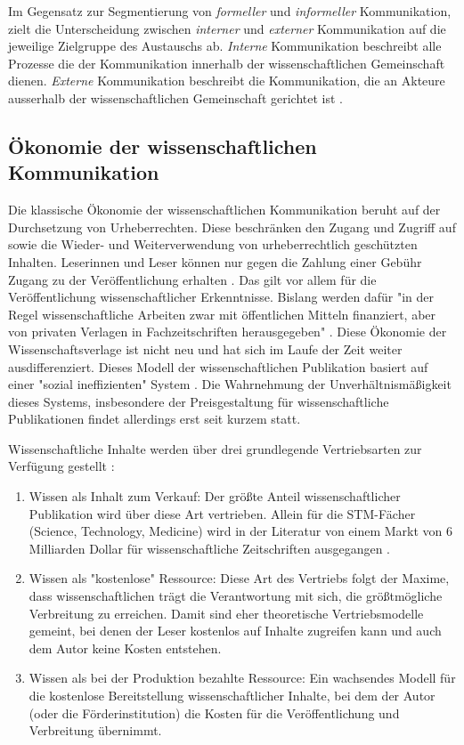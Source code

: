 Im Gegensatz zur Segmentierung von \textit{formeller} und \textit{informeller} Kommunikation, zielt die Unterscheidung zwischen \textit{interner} und \textit{externer} Kommunikation auf die jeweilige Zielgruppe des Austauschs ab. \textit{Interne} Kommunikation beschreibt alle Prozesse die der Kommunikation innerhalb der wissenschaftlichen Gemeinschaft dienen. \textit{Externe} Kommunikation beschreibt die Kommunikation, die an Akteure ausserhalb der wissenschaftlichen Gemeinschaft gerichtet ist \cite{Konneker_2013}.

\subsection{Ökonomie der wissenschaftlichen Kommunikation}

Die klassische Ökonomie der wissenschaftlichen Kommunikation beruht auf der Durchsetzung von Urheberrechten. Diese beschränken den Zugang und Zugriff auf sowie die Wieder- und Weiterverwendung von urheberrechtlich geschützten Inhalten. Leserinnen und Leser können nur gegen die Zahlung einer Gebühr Zugang zu der Veröffentlichung erhalten \cite{CREATe_2014}. Das gilt vor allem für die Veröffentlichung wissenschaftlicher Erkenntnisse. Bislang werden dafür "in der Regel wissenschaftliche Arbeiten zwar mit öffentlichen Mitteln finanziert, aber von privaten Verlagen in Fachzeitschriften herausgegeben" \cite{WD_bundestag_2009}. Diese Ökonomie der Wissenschaftsverlage ist nicht neu und hat sich im Laufe der Zeit weiter ausdifferenziert. Dieses Modell der wissenschaftlichen Publikation basiert auf einer "sozial ineffizienten" System \cite{mueller-langer_2010}. Die Wahrnehmung der Unverhältnismäßigkeit dieses Systems, insbesondere der Preisgestaltung für wissenschaftliche Publikationen \cite{King_2008} findet allerdings erst seit kurzem statt\cite{CREATe_2014}.

Wissenschaftliche Inhalte werden über drei grundlegende Vertriebsarten zur Verfügung gestellt \cite{cope2014future}:
\begin{enumerate}
\item Wissen als Inhalt zum Verkauf: Der größte Anteil wissenschaftlicher Publikation wird über diese Art vertrieben. Allein für die STM-Fächer (Science, Technology, Medicine) wird in der Literatur von einem Markt von 6 Milliarden Dollar für wissenschaftliche Zeitschriften ausgegangen .
\item Wissen als "kostenlose" Ressource: Diese Art des Vertriebs folgt der Maxime, dass wissenschaftlichen trägt die Verantwortung mit sich, die größtmögliche Verbreitung zu erreichen. Damit sind eher theoretische Vertriebsmodelle gemeint, bei denen der Leser kostenlos auf Inhalte zugreifen kann und auch dem Autor keine Kosten entstehen.
\item Wissen als bei der Produktion bezahlte Ressource: Ein wachsendes Modell für die kostenlose Bereitstellung wissenschaftlicher Inhalte, bei dem der Autor (oder die Förderinstitution) die Kosten für die Veröffentlichung und Verbreitung übernimmt.
\end{enumerate}

